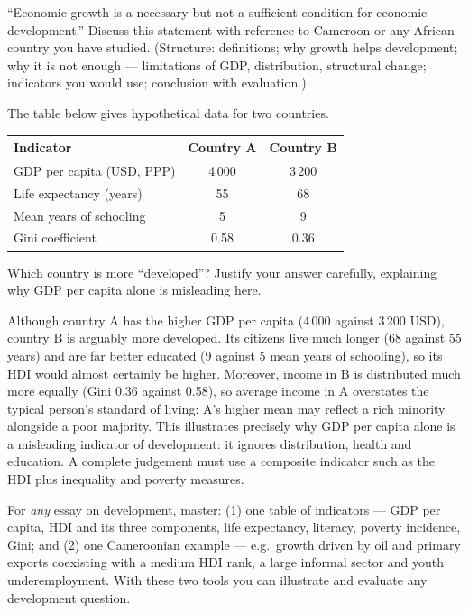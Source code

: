 \documentclass[11pt]{article}
\begin{document}
\begin{exercice}
``Economic growth is a necessary but not a sufficient condition for economic development.'' Discuss this statement with reference to Cameroon or any African country you have studied. (Structure: definitions; why growth helps development; why it is not enough — limitations of GDP, distribution, structural change; indicators you would use; conclusion with evaluation.)
\end{exercice}

\begin{exercice}
The table below gives hypothetical data for two countries.\par
\begin{center}
\begin{tabular}{|l|c|c|}
\hline
\rowcolor{popblueL} \textbf{Indicator} & \textbf{Country A} & \textbf{Country B} \\
\hline
GDP per capita (USD, PPP) & 4\,000 & 3\,200 \\
\hline
Life expectancy (years) & 55 & 68 \\
\hline
Mean years of schooling & 5 & 9 \\
\hline
Gini coefficient & 0.58 & 0.36 \\
\hline
\end{tabular}
\end{center}
Which country is more ``developed''? Justify your answer carefully, explaining why GDP per capita alone is misleading here.
\end{exercice}

\begin{corrige}[Exercise 2]
Although country A has the higher GDP per capita (4\,000 against 3\,200 USD), country B is arguably more developed. Its citizens live much longer (68 against 55 years) and are far better educated (9 against 5 mean years of schooling), so its HDI would almost certainly be higher. Moreover, income in B is distributed much more equally (Gini 0.36 against 0.58), so average income in A overstates the typical person's standard of living: A's higher mean may reflect a rich minority alongside a poor majority. This illustrates precisely why GDP per capita alone is a misleading indicator of development: it ignores distribution, health and education. A complete judgement must use a composite indicator such as the HDI plus inequality and poverty measures.
\end{corrige}

\begin{aretenir}
For \emph{any} essay on development, master: (1) one table of indicators — GDP per capita, HDI and its three components, life expectancy, literacy, poverty incidence, Gini; and (2) one Cameroonian example — e.g.\ growth driven by oil and primary exports coexisting with a medium HDI rank, a large informal sector and youth underemployment. With these two tools you can illustrate and evaluate any development question.
\end{aretenir}
\end{document}
